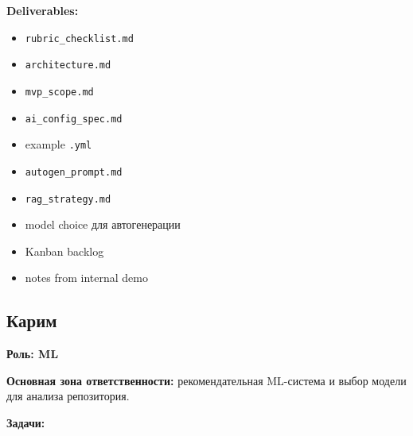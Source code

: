 \documentclass[12pt,a4paper]{article}
\begin{document}
\textbf{Deliverables:}
\begin{itemize}
    \item \texttt{rubric\_checklist.md}
    \item \texttt{architecture.md}
    \item \texttt{mvp\_scope.md}
    \item \texttt{ai\_config\_spec.md}
    \item example \texttt{.yml}
    \item \texttt{autogen\_prompt.md}
    \item \texttt{rag\_strategy.md}
    \item model choice для автогенерации
    \item Kanban backlog
    \item notes from internal demo
\end{itemize}

\subsection{Карим}

\textbf{Роль: ML}

\textbf{Основная зона ответственности:} рекомендательная ML-система и выбор модели для анализа репозитория.

\textbf{Задачи:}
\end{document}
